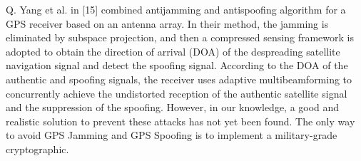     \newline
    Q. Yang et al. in [15] combined antijamming and antispoofing algorithm for a GPS receiver based on an antenna array. In their method, the jamming is eliminated by subspace projection, and then a compressed sensing framework is adopted to obtain the direction of arrival (DOA) of the despreading satellite navigation signal and detect the spoofing signal. According to the DOA of the authentic and spoofing signals, the receiver uses adaptive multibeamforming to concurrently achieve the undistorted reception of the authentic satellite signal and the suppression of the spoofing.
    \newline
    However, in our knowledge, a good and realistic solution to prevent these attacks has not yet been found. The only way to avoid GPS Jamming and GPS Spoofing is to implement a military-grade cryptographic.
    
